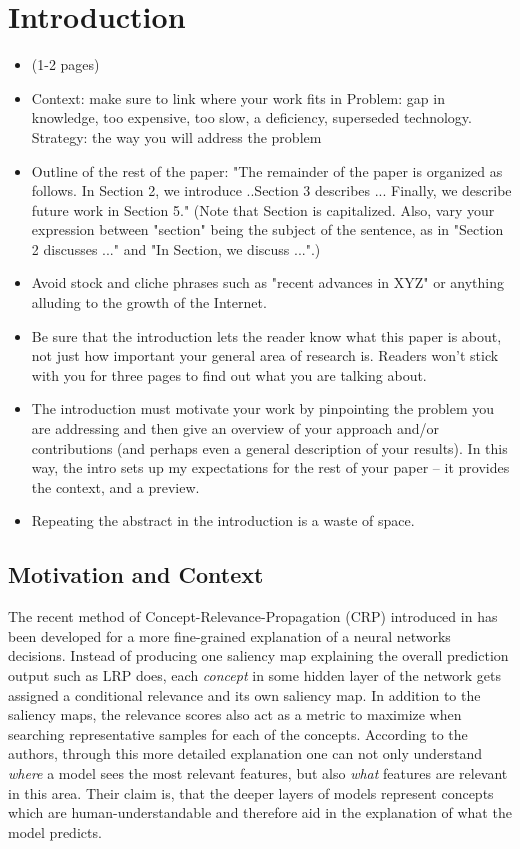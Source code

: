 \chapter{Introduction}\label{chapter:introduction}

\begin{itemize}
\color{red} 
    \item (1-2 pages)
    \item Context: make sure to link where your work fits in Problem: gap in knowledge, too expensive, too slow, a deficiency, superseded technology. Strategy: the way you will address the problem
    \item Outline of the rest of the paper: "The remainder of the paper is organized as follows. In Section 2, we introduce ..Section 3 describes ... Finally, we describe future work in Section 5." (Note that Section is capitalized. Also, vary your expression between "section" being the subject of the sentence, as in "Section 2 discusses ..." and "In Section, we discuss ...".)
    \item Avoid stock and cliche phrases such as "recent advances in XYZ" or anything alluding to the growth of the Internet. 
    \item Be sure that the introduction lets the reader know what this paper is about, not just how important your general area of research is. Readers won't stick with you for three pages to find out what you are talking about.
    \item The introduction must motivate your work by pinpointing the problem you are addressing and then give an overview of your approach and/or contributions (and perhaps even a general description of your results). In this way, the intro sets up my expectations for the rest of your paper -- it provides the context, and a preview.
    \item Repeating the abstract in the introduction is a waste of space.
\end{itemize}


\section{Motivation and Context}
The recent method of Concept-Relevance-Propagation (CRP) introduced in \cite{Achtibat2022} has been developed for a more fine-grained explanation of a neural networks decisions. Instead of producing one saliency map explaining the overall prediction output such as LRP \cite{Bach2015} does, each \textit{concept} in some hidden layer of the network gets assigned a conditional relevance and its own saliency map. In addition to the saliency maps, the relevance scores also act as a metric to maximize when searching representative samples for each of the concepts. According to the authors, through this more detailed explanation one can not only understand \textit{where} a model sees the most relevant features, but also \textit{what} features are relevant in this area. Their claim is, that the deeper layers of models represent concepts which are human-understandable and therefore aid in the explanation of what the model predicts. 

